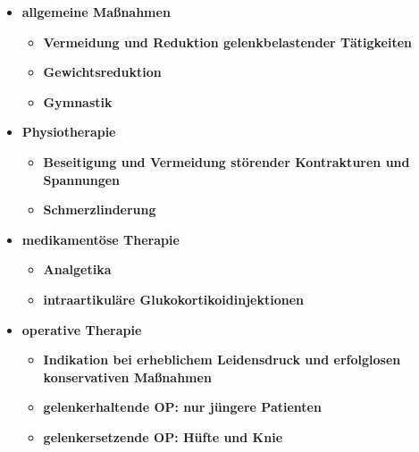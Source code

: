 \begin{itemize}
\begin{itemize}
\begin{itemize}
						\item \textbf{allgemeine Maßnahmen}
							\begin{itemize}
								\item \textbf{Vermeidung und Reduktion gelenkbelastender Tätigkeiten}
								\item \textbf{Gewichtsreduktion}
								\item \textbf{Gymnastik}
							\end{itemize}
						\item \textbf{Physiotherapie}
							\begin{itemize}
								\item \textbf{Beseitigung und Vermeidung störender Kontrakturen und Spannungen}
								\item \textbf{Schmerzlinderung}
							\end{itemize}
						\item \textbf{medikamentöse Therapie}
							\begin{itemize}
								\item \textbf{Analgetika}
								\item \textbf{intraartikuläre Glukokortikoidinjektionen}
							\end{itemize}
						\item \textbf{operative Therapie}
							\begin{itemize}
								\item \textbf{Indikation bei erheblichem Leidensdruck und erfolglosen konservativen Maßnahmen}
								\item \textbf{gelenkerhaltende OP: nur jüngere Patienten}
								\item \textbf{gelenkersetzende OP: Hüfte und Knie}
				  			\end{itemize}
					\end{itemize}
  			\end{itemize}
  	\end{itemize}

